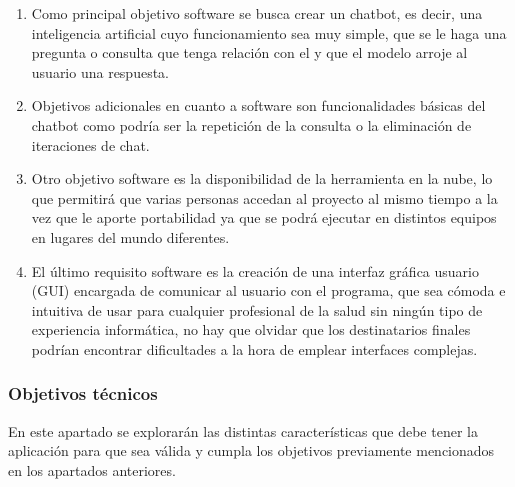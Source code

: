 \begin{enumerate}

    \item Como principal objetivo software se busca crear un chatbot, es decir, una inteligencia artificial cuyo funcionamiento sea muy simple, que se le haga una pregunta o consulta que tenga relación con el y que el modelo arroje al usuario una respuesta.
    
    \item Objetivos adicionales en cuanto a software son funcionalidades básicas del chatbot como podría ser la repetición de la consulta o la eliminación de iteraciones de chat.
    
    \item Otro objetivo software es la disponibilidad de la herramienta en la nube, lo que permitirá que varias personas accedan al proyecto al mismo tiempo a la vez que le aporte portabilidad ya que se podrá ejecutar en distintos equipos en lugares del mundo diferentes.

    \item El último requisito software es la creación de una interfaz gráfica usuario (GUI) encargada de comunicar al usuario con el programa, que sea cómoda e intuitiva de usar para cualquier profesional de la salud sin ningún tipo de experiencia informática, no hay que olvidar que los destinatarios finales podrían encontrar dificultades a la hora de emplear interfaces complejas.
    
\end{enumerate}

\subsubsection{Objetivos técnicos}

En este apartado se explorarán las distintas características que debe tener la aplicación para que sea válida y cumpla los objetivos previamente mencionados en los apartados anteriores.

